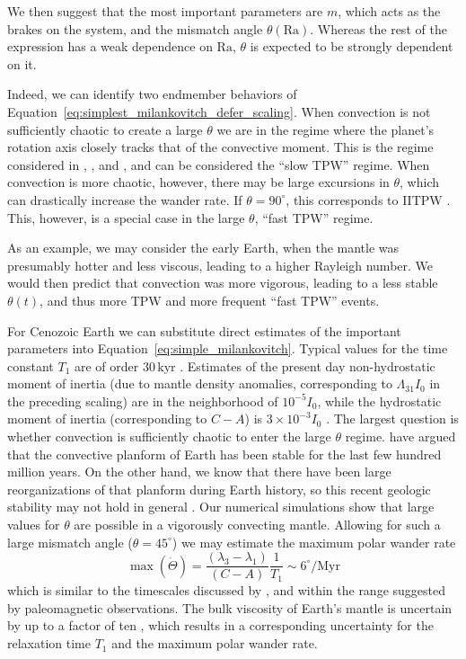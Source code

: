 \documentclass[extra,mreferee]{gji}
\begin{document}
We then suggest that the most important parameters are $m$, which acts as the brakes on the system, and the mismatch angle $\theta(\mathrm{Ra})$.
Whereas the rest of the expression has a weak dependence on $\mathrm{Ra}$, $\theta$ is expected to be strongly dependent on it.

Indeed, we can identify two endmember behaviors of Equation~\eqref{eq:simplest_milankovitch_defer_scaling}.
When convection is not sufficiently chaotic to create a large $\theta$ we are in the regime where the planet's rotation axis closely tracks that of the convective moment.
This is the regime considered in \citet{steinberger1997changes}, \citet{roberts2007cause}, and \citet{zhong2007supercontinent}, and can be considered the ``slow TPW'' regime.
When convection is more chaotic, however, there may be large excursions in $\theta$, which can drastically increase the wander rate.  
If $\theta=90^\circ$, this corresponds to IITPW \citep{kirschvink1997evidence}.  
This, however, is a special case in the large $\theta$, ``fast TPW'' regime.

As an example, we may consider the early Earth, when the mantle was presumably hotter and less viscous, leading to a 
higher Rayleigh number. We would then predict that convection was more vigorous, leading to 
a less stable $\theta(t)$, and thus more TPW and more frequent ``fast TPW'' events.

For Cenozoic Earth we can substitute direct estimates of the important parameters into Equation~\eqref{eq:simple_milankovitch}.
Typical values for the time constant $T_1$ are of order $30 \, \mathrm{kyr}$ \citep{ricard1993polar}.
Estimates of the present day non-hydrostatic moment of inertia (due to mantle density anomalies, corresponding to $\Lambda_{31}I_0$ in the preceding scaling)
are in the neighborhood of $10^{-5} I_0$, while the hydrostatic moment of inertia (corresponding to $C-A$) is $3 \times 10^{-3} I_0$ \citep{chambat2001mean}.
The largest question is whether convection is sufficiently chaotic to enter the large $\theta$ regime. 
\citet{richards1997explanation} have argued that the convective planform of Earth has been stable for the last
few hundred million years. On the other hand, we know that there have been large reorganizations of that planform 
during Earth history, so this recent geologic stability may not hold in general \citep{evans2003true}.
Our numerical simulations show that large values for $\theta$ are possible in a vigorously convecting mantle.
Allowing for such a large mismatch angle ($\theta = 45^\circ$) we may estimate the maximum polar wander rate
\begin{equation}
\max ( \dot{\Theta} ) = \frac{(\lambda_3-\lambda_1)}{(C-A)}\frac{1}{T_1} \sim 6^\circ / \mathrm{Myr}
\end{equation}
which is similar to the timescales discussed by \citet{cambiotti2011new}, and within the range 
suggested by paleomagnetic observations.
The bulk viscosity of Earth's mantle is uncertain by up to a factor of ten \citep{mitrovica2004new},
which results in a corresponding uncertainty for the relaxation time $T_1$ and the maximum polar wander rate.
\end{document}
